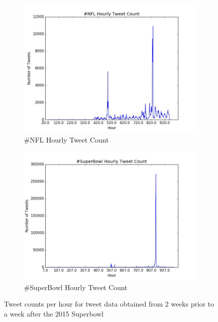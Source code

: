 \documentclass[12pt]{article}
\begin{document}
\begin{figure}[H]
	\centering
	\begin{subfigure}{.45\textwidth}
		\centering
		\includegraphics[width=\textwidth]{figures/1_NFL_histogram.jpeg}
		\centering
		\caption{\#NFL Hourly Tweet Count}
		\label{prob1:fig:1}
	\end{subfigure}%
	\hfill
	\begin{subfigure}{.45\textwidth}
		\centering
		\includegraphics[width=\textwidth]{figures/1_SuperBowl_histogram.jpeg}
		\centering
		\caption{\#SuperBowl Hourly Tweet Count}
		\label{prob1:fig:2}
	\end{subfigure}
	\caption{Tweet counts per hour for tweet data obtained from 2 weeks prior to a week after the 2015 Superbowl}
\end{figure}
\end{document}
